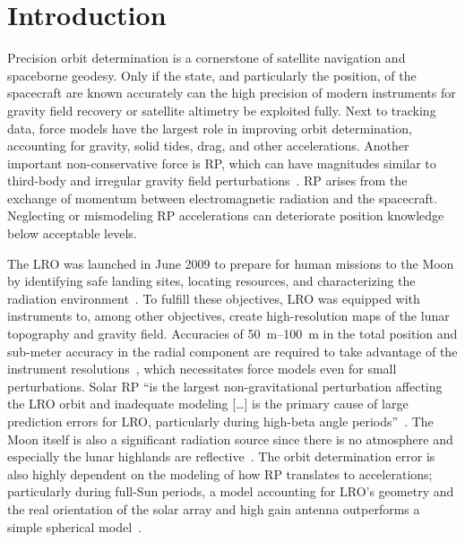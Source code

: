 \section{Introduction}
\label{sec:introduction}

Precision orbit determination is a cornerstone of satellite navigation and spaceborne geodesy. Only if the state, and particularly the position, of the spacecraft are known accurately can the high precision of modern instruments for gravity field recovery or satellite altimetry be exploited fully. Next to tracking data, force models have the largest role in improving orbit determination, accounting for gravity, solid tides, drag, and other accelerations. Another important non-conservative force is \acrfull{RP}, which can have magnitudes similar to third-body and irregular gravity field perturbations~\cite{Montenbruck2000}. \gls{RP} arises from the exchange of momentum between electromagnetic radiation and the spacecraft. Neglecting or mismodeling \gls{RP} accelerations can deteriorate position knowledge below acceptable levels.

The \acrfull{LRO} was launched in June 2009 to prepare for human missions to the Moon by identifying safe landing sites, locating resources, and characterizing the radiation environment~\cite{Tooley2010}. To fulfill these objectives, \gls{LRO} was equipped with instruments to, among other objectives, create high-resolution maps of the lunar topography and gravity field. Accuracies of \qtyrange{50}{100}{\m} in the total position and sub-meter accuracy in the radial component are required to take advantage of the instrument resolutions~\cite{Chin2007,Zuber2009}, which necessitates force models even for small perturbations. Solar \gls{RP} \enquote{is the largest non-gravitational perturbation affecting the LRO orbit and inadequate modeling [\ldots] is the primary cause of large prediction errors for LRO, particularly during high-beta angle periods}~\cite{Slojkowski2015}. The Moon itself is also a significant radiation source since there is no atmosphere and especially the lunar highlands are reflective~\cite{Floberghagen1999}. The orbit determination error is also highly dependent on the modeling of how \gls{RP} translates to accelerations; particularly during full-Sun periods, a model accounting for \gls{LRO}'s geometry and the real orientation of the solar array and high gain antenna outperforms a simple spherical model~\cite{Slojkowski2014}.
 
